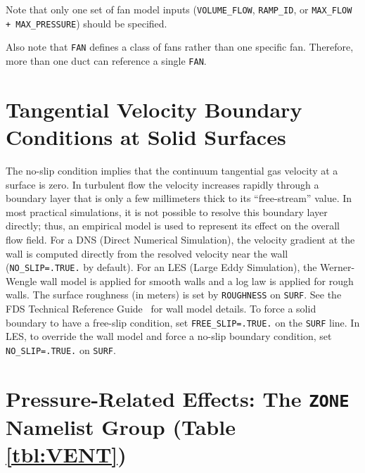 \documentclass[11pt]{book}
\newcommand{\ct}{\tt\small}
\begin{document}
\noindent
Note that only one set of fan model inputs ({\ct VOLUME\_FLOW}, {\ct RAMP\_ID}, or {\ct MAX\_FLOW + MAX\_PRESSURE}) should be specified.

Also note that {\ct FAN} defines a class of fans rather than one specific fan. Therefore, more than one duct can reference a single {\ct FAN}.

\clearpage



\section{Tangential Velocity Boundary Conditions at Solid Surfaces}
\label{info:WALL_MODEL}

The no-slip condition implies that the continuum tangential gas velocity at a surface is zero.
In turbulent flow the velocity increases rapidly through a boundary layer that is only a few millimeters thick to its ``free-stream'' value.
In most practical simulations, it is not possible to resolve this boundary layer directly; thus, an empirical model is used to represent its effect on the overall flow field.
For a DNS (Direct Numerical Simulation), the velocity gradient at the wall is computed directly from the resolved velocity near the wall ({\ct NO\_SLIP=.TRUE.} by default).
For an LES (Large Eddy Simulation), the Werner-Wengle wall model is applied for smooth walls and a log law is applied for rough walls.
The surface roughness (in meters) is set by {\ct ROUGHNESS} on {\ct SURF}. See the FDS Technical Reference Guide~\cite{FDS_Math_Guide} for wall model details.
To force a solid boundary to have a free-slip condition, set {\ct FREE\_SLIP=.TRUE.} on the {\ct SURF} line.
In LES, to override the wall model and force a no-slip boundary condition, set {\ct NO\_SLIP=.TRUE.} on {\ct SURF}.



\clearpage

\section{Pressure-Related Effects: The \texorpdfstring{{\tt ZONE}}{ZONE} Namelist Group (Table \ref{tbl:VENT})}
\label{info:ZONE}
\end{document}
